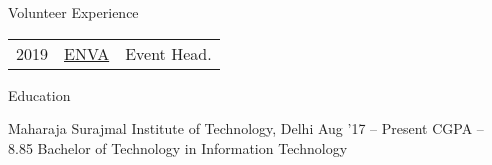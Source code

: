 \documentclass{resume} %
\begin{document}
\begin{rSection}{Volunteer Experience}
  \begin{tabular}{rll}
2019	    & {\href{http://www.msit.in/media/2019/03/20/report-on-enva.pdf}{ENVA}}  & Event Head.\\
\end{tabular}
\end{rSection}


\begin{rSection}{Education}
  \begin{rEducationSection}{Maharaja Surajmal Institute of Technology, Delhi}
                           {Aug '17 -- Present}
                           {CGPA -- 8.85}
                           {Bachelor of Technology in Information Technology}
  \end{rEducationSection}
\end{rSection}
\end{document}
